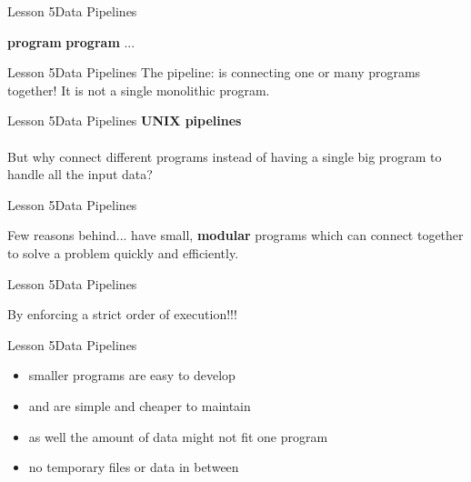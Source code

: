 \documentclass[aspectratio=1610]{beamer}
\begin{document}
\begin{frame}{Lesson 5}{Data Pipelines}
\Huge
\begin{center}
\textbf{program} \text{\textbar} \textbf{program} \text{\textbar} ... 
\end{center}
\end{frame}



\begin{frame}
\end{frame}


\begin{frame}{Lesson 5}{Data Pipelines}
\Huge
The pipeline: is connecting one or many programs together! It is not 
a single monolithic program.
\end{frame}


\begin{frame}{Lesson 5}{Data Pipelines}
\LARGE
\textbf{UNIX pipelines}\\~\\
\Huge
But why connect different programs instead of having a single big 
program to handle all the input data?
\end{frame}


\begin{frame}{Lesson 5}{Data Pipelines}
\Huge
\begin{center}
Few reasons behind... have small, \textbf{modular} programs which 
can connect together to solve a problem quickly and efficiently.
\end{center}
\end{frame}

\begin{frame}{Lesson 5}{Data Pipelines}
\Huge
\begin{center}
By \alert{enforcing} a strict \alert{order} of execution!!!
\end{center}
\end{frame}


\begin{frame}{Lesson 5}{Data Pipelines}
\huge
\begin{itemize}
    \item smaller programs are easy to develop 
    \item and are simple and cheaper to maintain
    \item as well the amount of data might not fit one program
    \item no temporary files or data in between
\end{itemize}
\end{frame}
\end{document}
